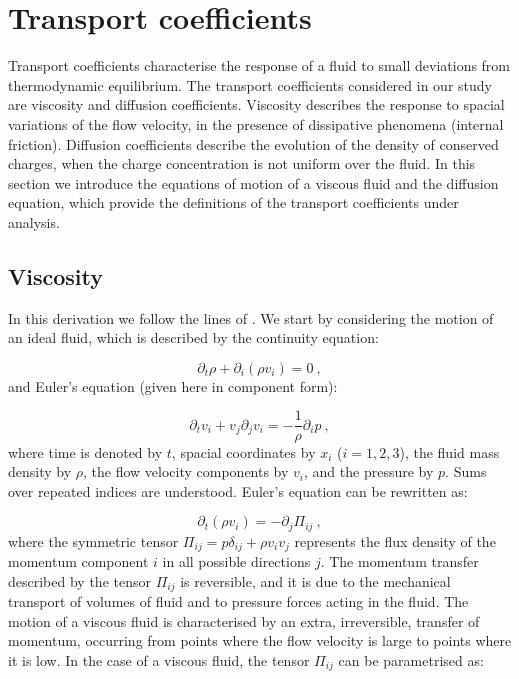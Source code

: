 
\section{Transport coefficients}

Transport coefficients characterise the response of a fluid to small deviations from thermodynamic equilibrium. The transport coefficients considered in our study are viscosity and diffusion coefficients. Viscosity describes the response to spacial variations of the flow velocity, in the presence of dissipative phenomena (internal friction). Diffusion coefficients describe the evolution of the density of conserved charges, when the charge concentration is not uniform over the fluid. In this section we introduce the equations of motion of a viscous fluid and the diffusion equation, which provide the definitions of the transport coefficients under analysis.

\subsection{Viscosity}

In this derivation we follow the lines of \cite{landau2013fluid}. We start by considering the motion of an ideal fluid, which is described by the continuity equation:

\begin{equation}
\partial_t \rho + \partial_i (\rho v_i) = 0 \: ,
\end{equation}
%
and Euler's equation (given here in component form):

\begin{equation}
\partial_t v_i +  v_j \partial_j v_i = -\frac{1}{\rho} \partial_i p \: ,
\end{equation}
%
where time is denoted by $t$, spacial coordinates by $x_i$ ($i=1,2,3$), the fluid mass density by $\rho$, the flow velocity components by $v_i$,  and the pressure by $p$. Sums over repeated indices are understood. Euler's equation can be rewritten as:

\begin{equation}
\partial_t (\rho v_i) = - \partial_j \Pi_{ij} \: ,
\label{Euler}
\end{equation}
%
where the symmetric tensor $\Pi_{ij} = p \delta_{ij} + \rho v_i v_j$ represents the flux density of the momentum component $i$ in all possible directions $j$. The momentum transfer described by the tensor $\Pi_{ij}$ is reversible, and it is due to the mechanical transport of volumes of fluid and to pressure forces acting in the fluid. The motion of a viscous fluid is characterised by an extra, irreversible, transfer of momentum, occurring from points where the flow velocity is large to points where it is low.
In the case of a viscous fluid, the tensor $\Pi_{ij}$ can be parametrised as:

